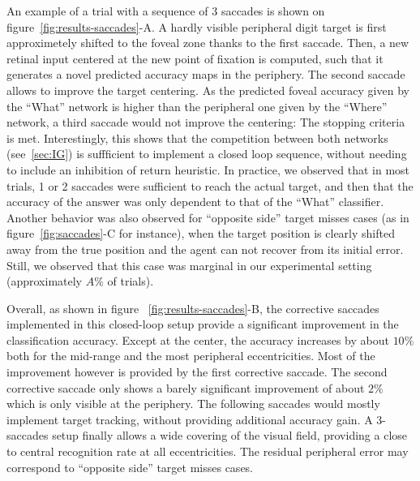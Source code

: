 An example of a trial with a sequence of 3 saccades is shown on figure~\ref{fig:results-saccades}-A. A hardly visible peripheral digit target is first approximetely shifted to the foveal zone thanks to the first saccade. Then, a new retinal input centered at the new point of fixation is computed, such that it generates a novel predicted accuracy maps in the periphery. The second saccade allows to improve the target centering. As the predicted foveal accuracy given by the ``What'' network is higher than the peripheral one given by the ``Where'' network, a third saccade would not improve the centering: The stopping criteria is met. Interestingly, this shows that the competition between both networks (see~\ref{sec:IG}) is suffficient to implement a closed loop sequence, without needing to include an inhibition of return heuristic. In practice, we observed that in most trials, 1 or 2 saccades were sufficient to reach the actual target, and then that the accuracy of the answer was only dependent to that of the ``What'' classifier. Another behavior was also observed for ``opposite side'' target misses cases (as in figure~\ref{fig:saccades}-C for instance), when the target position is clearly shifted away from the true position and the agent can not recover from its initial error. Still, we observed that this case was marginal in our experimental setting (approximately $A\%$ of trials).

Overall, as shown in figure ~\ref{fig:results-saccades}-B, the corrective saccades implemented in this closed-loop setup provide a significant improvement in the classification accuracy. Except at the center, the accuracy increases by about $10\%$ both for the mid-range and the most peripheral eccentricities. Most of the improvement however is provided by the first corrective saccade. The second corrective saccade only shows a barely significant improvement of about $2\%$ which is only visible at the periphery. The following saccades would mostly implement target tracking, without providing additional accuracy gain. A 3-saccades setup finally allows a wide covering of the visual field, providing a close to central  recognition rate at all eccentricities. The residual peripheral error may correspond to ``opposite side'' target misses cases.

